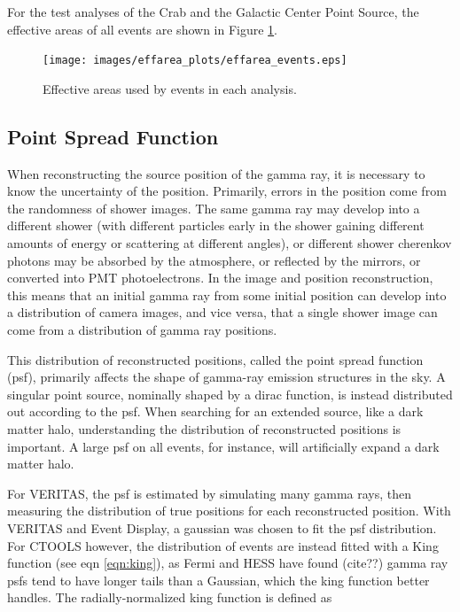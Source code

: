     For the test analyses of the Crab and the Galactic Center Point Source, the effective areas of all events are shown in Figure \ref{fig:effarea_usage}.

    \begin{figure}[ht]
      \centering
      \texttt{[image: images/effarea\_plots/effarea\_events.eps]}
      \caption[Effective Areas Used]
      {Effective areas used by events in each analysis.}
      \label{fig:effarea_usage}
    \end{figure}

    \subsection{Point Spread Function}\label{subsec:psf}

    When reconstructing the source position of the gamma ray, it is necessary to know the uncertainty of the position.
    Primarily, errors in the position come from the randomness of shower images.
    The same gamma ray may develop into a different shower (with different particles early in the shower gaining different amounts of energy or scattering at different angles), or different shower cherenkov photons may be absorbed by the atmosphere, or reflected by the mirrors, or converted into PMT photoelectrons.
    In the image and position reconstruction, this means that an initial gamma ray from some initial position can develop into a distribution of camera images, and vice versa, that a single shower image can come from a distribution of gamma ray positions.

    This distribution of reconstructed positions, called the point spread function (psf), primarily affects the shape of gamma-ray emission structures in the sky.
    A singular point source, nominally shaped by a dirac function, is instead distributed out according to the psf.
    When searching for an extended source, like a dark matter halo, understanding the distribution of reconstructed positions is important.
    A large psf on all events, for instance, will artificially expand a dark matter halo.

    For VERITAS, the psf is estimated by simulating many gamma rays, then measuring the distribution of true positions for each reconstructed position.
    With VERITAS and Event Display, a gaussian was chosen to fit the psf distribution.
    For CTOOLS however, the distribution of events are instead fitted with a King function (see eqn \ref{eqn:king}), as Fermi and HESS have found (cite??) gamma ray psfs tend to have longer tails than a Gaussian, which the king function better handles.
    The radially-normalized king function is defined as

